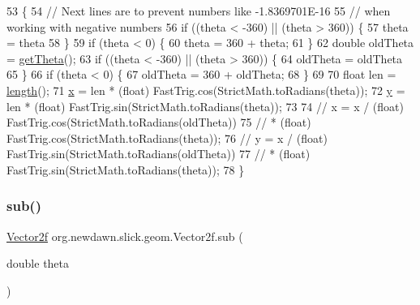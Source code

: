 \begin{DoxyCode}
53                                        \{
54         \textcolor{comment}{// Next lines are to prevent numbers like -1.8369701E-16}
55         \textcolor{comment}{// when working with negative numbers}
56         \textcolor{keywordflow}{if} ((theta < -360) || (theta > 360)) \{
57             theta = theta %
58         \}
59         \textcolor{keywordflow}{if} (theta < 0) \{
60             theta = 360 + theta;
61         \}
62         \textcolor{keywordtype}{double} oldTheta = \mbox{\hyperlink{classorg_1_1newdawn_1_1slick_1_1geom_1_1_vector2f_a84195f4ba1d982a324cf8ce49f981d6d}{getTheta}}();
63         \textcolor{keywordflow}{if} ((theta < -360) || (theta > 360)) \{
64             oldTheta = oldTheta %
65         \}
66         \textcolor{keywordflow}{if} (theta < 0) \{
67             oldTheta = 360 + oldTheta;
68         \}
69 
70         \textcolor{keywordtype}{float} len = \mbox{\hyperlink{classorg_1_1newdawn_1_1slick_1_1geom_1_1_vector2f_ada298fe38d235371020523e9655e9152}{length}}();
71         \mbox{\hyperlink{classorg_1_1newdawn_1_1slick_1_1geom_1_1_vector2f_a3c72cdf13ebc511a472e1a02002fa579}{x}} = len * (float) FastTrig.cos(StrictMath.toRadians(theta));
72         \mbox{\hyperlink{classorg_1_1newdawn_1_1slick_1_1geom_1_1_vector2f_aa03914f0c3d32063aa90e5bd7b74688e}{y}} = len * (float) FastTrig.sin(StrictMath.toRadians(theta));
73         
74 \textcolor{comment}{//      x = x / (float) FastTrig.cos(StrictMath.toRadians(oldTheta))}
75 \textcolor{comment}{//              * (float) FastTrig.cos(StrictMath.toRadians(theta));}
76 \textcolor{comment}{//      y = x / (float) FastTrig.sin(StrictMath.toRadians(oldTheta))}
77 \textcolor{comment}{//              * (float) FastTrig.sin(StrictMath.toRadians(theta));}
78     \} 
\end{DoxyCode}
\mbox{\label{classorg_1_1newdawn_1_1slick_1_1geom_1_1_vector2f_ac263b2353b2e095d13cb7ca169c04c5d}} 
\subsubsection{\texorpdfstring{sub()}{sub()}\hspace{0.1cm}{\footnotesize\ttfamily [1/2]}}
{\footnotesize\ttfamily \mbox{\hyperlink{classorg_1_1newdawn_1_1slick_1_1geom_1_1_vector2f}{Vector2f}} org.\+newdawn.\+slick.\+geom.\+Vector2f.\+sub (\begin{DoxyParamCaption}\item[{double}]{theta }\end{DoxyParamCaption})\hspace{0.3cm}{\ttfamily [inline]}}

